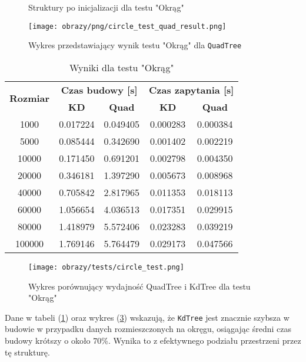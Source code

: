\documentclass[12pt]{article}
\begin{document}
\begin{figure}[h]
    \centering
    \qquad
    \caption{Struktury po inicjalizacji dla testu "Okrąg"}%
    \label{fig:circle}%
\end{figure}
\begin{figure}[h]
    \centering
    \texttt{[image: obrazy/png/circle\_test\_quad\_result.png]}
    \caption{Wykres przedstawiający wynik testu "Okrąg" dla \texttt{QuadTree}}
    \label{fig:circle_test_quad_result}
\end{figure}
\begin{table}[h]
\centering
\caption{Wyniki dla testu "Okrąg"}
\label{tab:circle_test}
\begin{tabular}{ccccc}
\toprule
\multirow{2}{*}{\textbf{Rozmiar}} & \multicolumn{2}{c}{\textbf{Czas budowy [s]}} & \multicolumn{2}{c}{\textbf{Czas zapytania [s]}} \\
\cmidrule(lr){2-3} \cmidrule(lr){4-5}
 & \textbf{KD} & \textbf{Quad} & \textbf{KD} & \textbf{Quad} \\
\midrule
1000   & 0.017224 & 0.049405 & 0.000283 & 0.000384 \\
5000   & 0.085444 & 0.342690 & 0.001402 & 0.002219 \\
10000  & 0.171450 & 0.691201 & 0.002798 & 0.004350 \\
20000  & 0.346181 & 1.397290 & 0.005673 & 0.008968 \\
40000  & 0.705842 & 2.817965 & 0.011353 & 0.018113 \\
60000  & 1.056654 & 4.036513 & 0.017351 & 0.029915 \\
80000  & 1.418979 & 5.572406 & 0.023283 & 0.039219 \\
100000 & 1.769146 & 5.764479 & 0.029173 & 0.047566 \\
\bottomrule
\end{tabular}
\end{table}

\begin{figure}[h]
    \centering
    \texttt{[image: obrazy/tests/circle\_test.png]}
    \caption{Wykres porównujący wydajność QuadTree i KdTree dla testu "Okrąg"}
    \label{fig:circle_tests}
\end{figure}

\newpage
\noindent Dane w tabeli (\ref{tab:circle_test}) oraz wykres (\ref{fig:circle_tests}) wskazują, że \texttt{KdTree} jest znacznie szybsza w budowie w przypadku danych rozmieszczonych na okręgu, osiągając średni czas budowy krótszy o około 70\%. Wynika to z efektywnego podziału przestrzeni przez tę strukturę.
\end{document}
